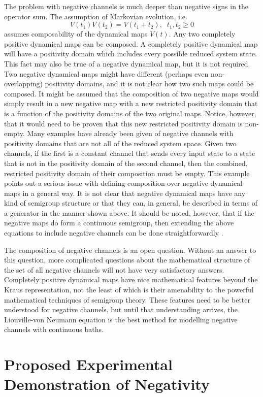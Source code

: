 The problem with negative channels is much deeper than negative signs in the operator sum.  The assumption of Markovian evolution, i.e.\
$$
V(t_1)V(t_2) = V(t_1+t_2),\;\;t_1,t_2\ge 0
$$ 
assumes composability of the dynamical maps $V(t)$.  Any two completely positive dynamical maps can be composed.  A completely positive dynamical map will have a positivity domain which includes every possible reduced system state.  This fact may also be true of a negative dynamical map, but it is not required.  Two negative dynamical maps might have different (perhaps even non-overlapping) positivity domains, and it is not clear how two such maps could be composed.  It might be assumed that the composition of two negative maps would simply result in a new negative map with a new restricted positivity domain that is a function of the positivity domains of the two original maps.  Notice, however, that it would need to be proven that this new restricted positivity domain is non-empty.  Many examples have already been given of negative channels with positivity domains that are not all of the reduced system space.  Given two channels, if the first is a constant channel that sends every input state to a state that is not in the positivity domain of the second channel, then the combined, restricted positivity domain of their composition must be empty.  This example points out a serious issue with defining composition over negative dynamical maps in a general way.  It is not clear that negative dynamical maps have any kind of semigroup structure or that they can, in general, be described in terms of a generator in the manner shown above.  It should be noted, however, that if the negative maps do form a continuous semigroup, then extending the above equations to include negative channels can be done straightforwardly \cite{Shaji2005}.

The composition of negative channels is an open question.  Without an answer to this question, more complicated questions about the mathematical structure of the set of all negative channels will not have very satisfactory answers.  Completely positive dynamical maps have nice mathematical features beyond the Kraus representation, not the least of which is their amenability to the powerful mathematical techniques of semigroup theory.  These features need to be better understood for negative channels, but until that understanding arrives, the Liouville-von Neumann equation is the best method for modelling negative channels with continuous baths.

\chapter{Proposed Experimental Demonstration of Negativity}
\label{sec:proposedexp}

